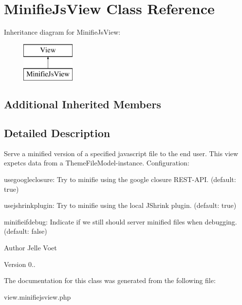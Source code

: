 \hypertarget{class_minifie_js_view}{\section{Minifie\-Js\-View Class Reference}
\label{class_minifie_js_view}
}
Inheritance diagram for Minifie\-Js\-View\-:\begin{figure}[H]
\begin{center}
\leavevmode
\includegraphics[height=2.000000cm]{class_minifie_js_view}
\end{center}
\end{figure}
\subsection*{Additional Inherited Members}


\subsection{Detailed Description}
Serve a minified version of a specified javascript file to the end user. This view expetcs data from a Theme\-File\-Model-\/instance. Configuration\-:
\begin{DoxyItemize}
\item usegoogleclosure\-: Try to minifie using the google closure R\-E\-S\-T-\/\-A\-P\-I. (default\-: true)
\item usejshrinkplugin\-: Try to minifie using the local J\-Shrink plugin. (default\-: true)
\item minifieifdebug\-: Indicate if we still should server minified files when debugging. (default\-: false)
\end{DoxyItemize}

\begin{DoxyAuthor}{Author}
Jelle Voet 
\end{DoxyAuthor}
\begin{DoxyVersion}{Version}
0.. 
\end{DoxyVersion}


The documentation for this class was generated from the following file\-:\begin{DoxyCompactItemize}
\item 
view.\-minifiejsview.\-php\end{DoxyCompactItemize}
